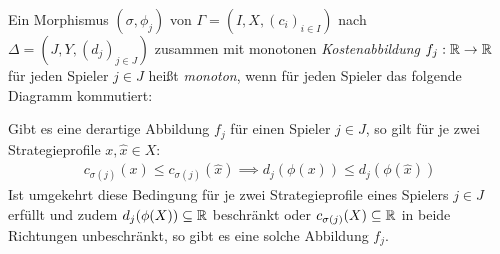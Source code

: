 \begin{defn}
	Ein Morphismus $(\sigma, \phi_j)$ von $\Gamma = (I, X, (c_i)_{i\in I})$ nach $\Delta = (J, Y, (d_j)_{j\in J})$ zusammen mit monotonen \emph{Kostenabbildung} $f_j: \mathbb{R} \to \mathbb{R}$ für jeden Spieler $j \in J$ heißt \emph{monoton}, wenn für jeden Spieler das folgende Diagramm kommutiert:	
	\begin{center}
	\end{center}
\end{defn}

\begin{bem}
	Gibt es eine derartige Abbildung $f_j$ für einen Spieler $j \in J$, so gilt für je zwei Strategieprofile $x, \hat{x} \in X$:
		\begin{align}\label{eq:CharExMonMor}
			c_{\sigma(j)}(x) \leq c_{\sigma(j)}(\hat{x}) \implies d_j(\phi(x)) \leq d_j(\phi(\hat{x}))
		\end{align}
	Ist umgekehrt diese Bedingung für je zwei Strategieprofile eines Spielers $j \in J$ erfüllt und zudem $d_j(\phi(X)) \subseteq \mathbb{R}$ beschränkt oder $c_{\sigma(j)}(X) \subseteq \mathbb{R}$ in beide Richtungen unbeschränkt, so gibt es eine solche Abbildung $f_j$.
\end{bem}

